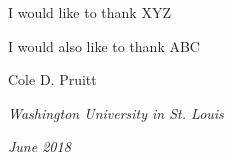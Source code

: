 

\noindent I would like to thank XYZ
\vspace{20pt}

\noindent I would also like to thank ABC
\vspace{20pt}

\begin{flushright}
  Cole D. Pruitt
\end{flushright}

\textit{Washington University in St. Louis}

\textit{June 2018}

\clearpage
